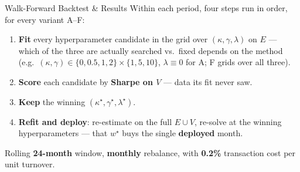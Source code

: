 \documentclass[aspectratio=169]{beamer}
\begin{document}
\begin{frame}{Walk-Forward Backtest \& Results}
  \vspace{0.1cm}
  Within each period, four steps run in order, for every variant A--F:
  \begin{enumerate}
    \item \textbf{Fit} every hyperparameter candidate in the grid over $(\kappa,\gamma,\lambda)$
          on $E$ --- which of the three are actually searched vs.\ fixed depends on the method
          (e.g.\ $(\kappa,\gamma)\in\{0,0.5,1,2\}\times\{1,5,10\}$, $\lambda\equiv0$ for A; F
          grids over all three).
    \item \textbf{Score} each candidate by \textbf{Sharpe on $V$} --- data its fit never saw.
    \item \textbf{Keep} the winning $(\kappa^\star,\gamma^\star,\lambda^\star)$.
    \item \textbf{Refit and deploy}: re-estimate on the full $E\cup V$, re-solve at the winning
          hyperparameters --- that $w^\star$ buys the single
          \textcolor{green!50!black}{\textbf{deployed}} month.
  \end{enumerate}
  \vspace{0.05cm}
  Rolling \textbf{24-month} window, \textbf{monthly} rebalance, with \textbf{0.2\%} transaction
  cost per unit turnover.
\end{frame}
\end{document}
